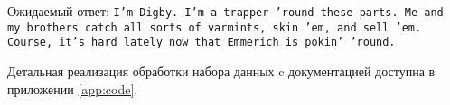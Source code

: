 Ожидаемый ответ: \texttt{I'm Digby. I'm a trapper 'round these parts. Me and my brothers catch all sorts of varmints, skin 'em, and sell 'em. Course, it's hard lately now that Emmerich is pokin' 'round.}

Детальная реализация обработки набора данных c документацией доступна в приложении \ref{app:code}.
